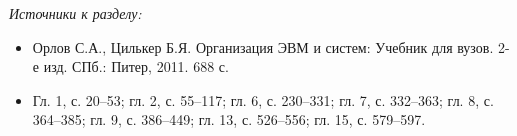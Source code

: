 \documentclass[a4paper,12pt]{article}
\begin{document}
\noindent\textit{Источники к разделу:}
\begin{itemize}
\item Орлов С.А., Цилькер Б.Я. Организация ЭВМ и систем: Учебник для вузов. 2-е изд. СПб.: Питер, 2011. 688 с.
\item Гл. 1, с. 20--53; гл. 2, с. 55--117; гл. 6, с. 230--331; гл. 7, с. 332--363; гл. 8, с. 364--385; гл. 9, с. 386--449; гл. 13, с. 526--556; гл. 15, с. 579--597.
\end{itemize}
\end{document}
